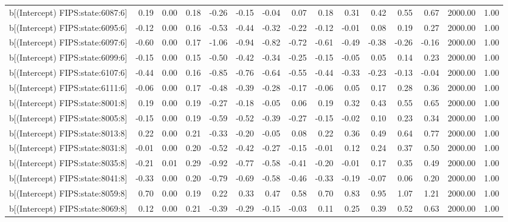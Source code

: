\begin{table}[ht]
\begin{tabular}{rrrrrrrrrrrrrrr}
  b[(Intercept) FIPS:state:6087:6] & 0.19 & 0.00 & 0.18 & -0.26 & -0.15 & -0.04 & 0.07 & 0.18 & 0.31 & 0.42 & 0.55 & 0.67 & 2000.00 & 1.00 \\ 
  b[(Intercept) FIPS:state:6095:6] & -0.12 & 0.00 & 0.16 & -0.53 & -0.44 & -0.32 & -0.22 & -0.12 & -0.01 & 0.08 & 0.19 & 0.27 & 2000.00 & 1.00 \\ 
  b[(Intercept) FIPS:state:6097:6] & -0.60 & 0.00 & 0.17 & -1.06 & -0.94 & -0.82 & -0.72 & -0.61 & -0.49 & -0.38 & -0.26 & -0.16 & 2000.00 & 1.00 \\ 
  b[(Intercept) FIPS:state:6099:6] & -0.15 & 0.00 & 0.15 & -0.50 & -0.42 & -0.34 & -0.25 & -0.15 & -0.05 & 0.05 & 0.14 & 0.23 & 2000.00 & 1.00 \\ 
  b[(Intercept) FIPS:state:6107:6] & -0.44 & 0.00 & 0.16 & -0.85 & -0.76 & -0.64 & -0.55 & -0.44 & -0.33 & -0.23 & -0.13 & -0.04 & 2000.00 & 1.00 \\ 
  b[(Intercept) FIPS:state:6111:6] & -0.06 & 0.00 & 0.17 & -0.48 & -0.39 & -0.28 & -0.17 & -0.06 & 0.05 & 0.17 & 0.28 & 0.36 & 2000.00 & 1.00 \\ 
  b[(Intercept) FIPS:state:8001:8] & 0.19 & 0.00 & 0.19 & -0.27 & -0.18 & -0.05 & 0.06 & 0.19 & 0.32 & 0.43 & 0.55 & 0.65 & 2000.00 & 1.00 \\ 
  b[(Intercept) FIPS:state:8005:8] & -0.15 & 0.00 & 0.19 & -0.59 & -0.52 & -0.39 & -0.27 & -0.15 & -0.02 & 0.10 & 0.23 & 0.34 & 2000.00 & 1.00 \\ 
  b[(Intercept) FIPS:state:8013:8] & 0.22 & 0.00 & 0.21 & -0.33 & -0.20 & -0.05 & 0.08 & 0.22 & 0.36 & 0.49 & 0.64 & 0.77 & 2000.00 & 1.00 \\ 
  b[(Intercept) FIPS:state:8031:8] & -0.01 & 0.00 & 0.20 & -0.52 & -0.42 & -0.27 & -0.15 & -0.01 & 0.12 & 0.24 & 0.37 & 0.50 & 2000.00 & 1.00 \\ 
  b[(Intercept) FIPS:state:8035:8] & -0.21 & 0.01 & 0.29 & -0.92 & -0.77 & -0.58 & -0.41 & -0.20 & -0.01 & 0.17 & 0.35 & 0.49 & 2000.00 & 1.00 \\ 
  b[(Intercept) FIPS:state:8041:8] & -0.33 & 0.00 & 0.20 & -0.79 & -0.69 & -0.58 & -0.46 & -0.33 & -0.19 & -0.07 & 0.06 & 0.20 & 2000.00 & 1.00 \\ 
  b[(Intercept) FIPS:state:8059:8] & 0.70 & 0.00 & 0.19 & 0.22 & 0.33 & 0.47 & 0.58 & 0.70 & 0.83 & 0.95 & 1.07 & 1.21 & 2000.00 & 1.00 \\ 
  b[(Intercept) FIPS:state:8069:8] & 0.12 & 0.00 & 0.21 & -0.39 & -0.29 & -0.15 & -0.03 & 0.11 & 0.25 & 0.39 & 0.52 & 0.63 & 2000.00 & 1.00 \\ 

\end{tabular}
\end{table}
